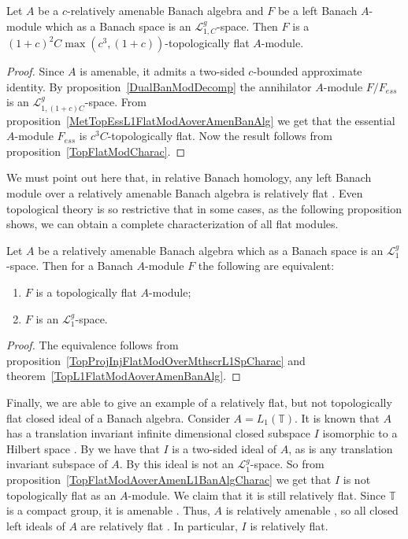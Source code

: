 \begin{theorem}\label{TopL1FlatModAoverAmenBanAlg} Let $A$ be a $c$-relatively
amenable Banach algebra and $F$ be a left Banach $A$-module which as a Banach
space is an $\mathscr{L}_{1, C}^g$-space. Then $F$ is a
${(1+c)}^2C\max(c^3,(1+c))$-topologically flat $A$-module.
\end{theorem}
\begin{proof} Since $A$ is amenable, it admits a two-sided $c$-bounded
approximate identity. By proposition~\ref{DualBanModDecomp} the annihilator
$A$-module $F/F_{ess}$ is an $\mathscr{L}_{1,(1+c)C}^g$-space. From
proposition~\ref{MetTopEssL1FlatModAoverAmenBanAlg} we get that the essential
$A$-module $F_{ess}$ is $c^3 C$-topologically flat. Now the result follows from
proposition~\ref{TopFlatModCharac}.
\end{proof}

We must point out here that, in relative Banach homology, any left Banach module
over a relatively amenable Banach algebra is relatively flat
\cite[theorem 7.1.60]{HelBanLocConvAlg}. Even topological theory is so
restrictive that in some cases, as the following proposition shows, we can
obtain a complete characterization of all flat modules.

\begin{proposition}\label{TopFlatModAoverAmenL1BanAlgCharac} Let $A$ be a
relatively amenable Banach algebra which as a Banach space is an
$\mathscr{L}_1^g$-space. Then for a Banach $A$-module $F$ the following are
equivalent:

\begin{enumerate}[label = (\roman*)]
    \item $F$ is a topologically flat $A$-module; 

    \item $F$ is an $\mathscr{L}_1^g$-space.
\end{enumerate}
\end{proposition}
\begin{proof} The equivalence follows from
proposition~\ref{TopProjInjFlatModOverMthscrL1SpCharac} and
theorem~\ref{TopL1FlatModAoverAmenBanAlg}.
\end{proof}

Finally, we are able to give an example of a relatively flat, but not topologically
flat closed ideal of a Banach algebra. Consider $A=L_1(\mathbb{T})$. It is known that
$A$ has a translation invariant infinite dimensional closed subspace $I$
isomorphic to a Hilbert space \cite[p.52]{RosProjTransInvSbspLpG}. By
\cite[proposition 1.4.7]{KaniBanAlg} we have that $I$ is a two-sided ideal of
$A$, as is any translation invariant subspace of $A$. By \cite[section 23.3]{DefFloTensNorOpId} this ideal is not an $\mathscr{L}_1^g$-space. So from
proposition~\ref{TopFlatModAoverAmenL1BanAlgCharac} we get that $I$ is not
topologically flat as an $A$-module. We claim that it is still relatively flat. Since
$\mathbb{T}$ is a compact group, it is amenable \cite[proposition 3.12.1]{PierAmenLCA}. Thus, $A$ is relatively amenable \cite[proposition VII.1.86]{HelBanLocConvAlg}, so all closed left ideals of $A$ are relatively flat
\cite[proposition VII.1.60(I)]{HelBanLocConvAlg}. In particular, $I$ is
relatively flat.

